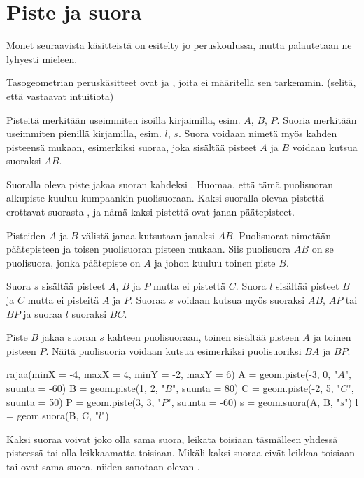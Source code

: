 \section*{Piste ja suora}

Monet seuraavista käsitteistä on esitelty jo peruskoulussa, mutta palautetaan ne lyhyesti
mieleen.

Tasogeometrian peruskäsitteet ovat  ja , joita ei
määritellä sen tarkemmin. (selitä, että vastaavat intuitiota)

Pisteitä merkitään useimmiten isoilla kirjaimilla, esim. $A$, $B$, $P$. Suoria merkitään useimmiten pienillä kirjamilla, esim. $l$, $s$. Suora voidaan nimetä myös kahden pisteensä mukaan, esimerkiksi suoraa, joka sisältää pisteet $A$ ja $B$ voidaan kutsua suoraksi $AB$.

Suoralla oleva piste jakaa suoran kahdeksi . Huomaa, että tämä puolisuoran
alkupiste kuuluu kumpaankin puolisuoraan. Kaksi suoralla olevaa pistettä erottavat suorasta
, ja nämä kaksi pistettä ovat janan päätepisteet.

Pisteiden $A$ ja $B$ välistä janaa kutsutaan janaksi $AB$. Puolisuorat nimetään päätepisteen ja toisen puolisuoran pisteen mukaan. Siis puolisuora $AB$ on se puolisuora, jonka päätepiste on $A$ ja johon kuuluu toinen piste $B$.

\begin{esimerkki}
Suora $s$ sisältää pisteet $A$, $B$ ja $P$ mutta ei pistettä $C$. Suora $l$ sisältää pisteet $B$ ja $C$ mutta ei pisteitä $A$ ja $P$. Suoraa $s$ voidaan kutsua myös suoraksi $AB$, $AP$ tai $BP$ ja suoraa $l$ suoraksi $BC$.

Piste $B$ jakaa suoran $s$ kahteen puolisuoraan, toinen sisältää pisteen $A$ ja toinen pisteen $P$. Näitä puolisuoria voidaan kutsua esimerkiksi puolisuoriksi $BA$ ja $BP$.

\begin{center}
\begin{kuva}
	rajaa(minX = -4, maxX = 4, minY = -2, maxY = 6)
	A = geom.piste(-3, 0, "$A$", suunta = -60)
	B = geom.piste(1, 2, "$B$", suunta = 80)
	C = geom.piste(-2, 5, "$C$", suunta = 50)
	P = geom.piste(3, 3, "$P$", suunta = -60)
	s = geom.suora(A, B, "$s$")
	l = geom.suora(B, C, "$l$")
\end{kuva}
\end{center}
\end{esimerkki}

Kaksi suoraa voivat joko olla sama suora, leikata toisiaan täsmälleen yhdessä pisteessä tai olla leikkaamatta toisiaan. Mikäli kaksi suoraa eivät leikkaa toisiaan tai ovat sama suora, niiden sanotaan olevan .

